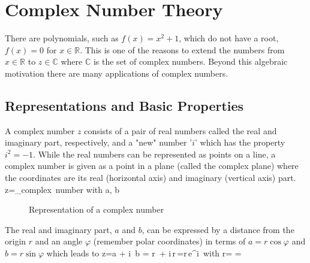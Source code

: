 

\section{Complex Number Theory}
There are polynomials, such as $f(x)=x^{2}+1$, which do not have a root, $f(x)=0$ for
$x \in \mathbb{R}$. This is one of the reasons to extend the numbers from
$x \in \mathbb{R}$ to $z \in \mathbb{C}$ where $\mathbb{C}$ is the set of complex numbers.
Beyond this algebraic motivation there are many applications of complex numbers.

\subsection{Representations and Basic Properties}
A complex number $z$ consists of a pair of real numbers called the real and imaginary part,
respectively, and a "new" number '$i$' which has the property $i^2=-1$. While the real
numbers can be represented as points on a line, a complex number is given as a point in a
plane (called the complex plane) where the coordinates are its real (horizontal axis) and
imaginary (vertical axis) part.
\bnn z=_{\mbox{\small complex number}}
\qquad \mbox{with}  \quad a, b \in {} \enn
\begin{figure}[!h]
    \centerline{\epsfxsize=10cm  } \svs
    \caption{Representation of a complex number} \label{fig49}
\end{figure} \vs

The real and imaginary part, $a$ and $b$, can be expressed by a distance from the origin $r$
and an angle $\varphi$ (remember polar coordinates) in terms of $a=r\cos\varphi$ and
$b=r\sin\varphi$ which leads to
\bnn  z=a + i\, b = r\, \cos\varphi + i\,r\,\sin\varphi=r\,e^{i\,\varphi} \qquad \mbox{with} \quad
r= \quad \varphi=\arctan{} \enn

